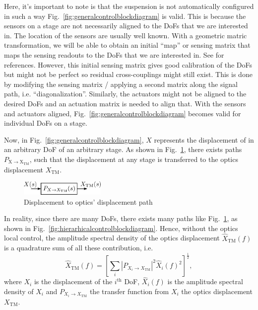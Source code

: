 Here, it's important to note is that the suspension is not automatically configured in such a way Fig.~\ref{fig:generalcontrolblockdiagram} is valid.
This is because the sensors on a stage are not necessarily aligned to the DoFs that we are interested in.
The location of the sensors are usually well known.
With a geometric matric transformation, we will be able to obtain an initial ``map'' or sensing matrix that maps the sensing readouts to the DoFs that we are interested in.
See \cite{bs_suspension_diagonalization, sr_suspension_diagonalization, all_of_the_vibration,  sensing_matrices_oplev} for references.
However, this initial sensing matrix gives good calibration of the DoFs but might not be perfect so residual cross-couplings might still exist.
This is done by modifying the sensing matrix / applying a second matrix along the signal path, i.e. ``diagonalization''.
Similarly, the actuators might not be aligned to the desired DoFs and an actuation matrix is needed to align that.
With the sensors and actuators aligned, Fig.~\ref{fig:generalcontrolblockdiagram} becomes valid for individual DoFs on a stage.

Now, in Fig.~\ref{fig:generalcontrolblockdiagram}, $X$ represents the displacement of in an arbitrary DoF of an arbitrary stage.
As shown in Fig.~\ref{fig:displacementtooptics}, there exists paths $P_\mathrm{X\to X_\mathrm{TM}}$, such that the displacement at any stage is transferred to the optics displacement $X_\mathrm{TM}$.
\begin{figure}[!h]
	\centering
	\includegraphics[width=41mm]{figures/displacement_to_optics}
	\caption{Displacement to optics' displacement path}
	\label{fig:displacementtooptics}
\end{figure}
In reality, since there are many DoFs, there exists many paths like Fig.~\ref{fig:displacementtooptics}, as shown in Fig.~\ref{fig:hierarhicalcontrolblockdiagram}.
Hence, without the optics local control, the amplitude spectral density of the optics displacement $\hat{X}_\mathrm{TM}(f)$ is a quadrature sum of all these contribution, i.e.
\begin{equation}
	\hat{X}_\mathrm{TM}(f)=\left[\sum_i\left\lvert P_{X_i\to X_\mathrm{TM}}\right\rvert^2 \hat{X}_i(f)^2\right]^{\frac{1}{2}},
	\label{eqn:x_tm_asd}
\end{equation}
where $X_i$ is the displacement of the $i^\mathrm{th}$ DoF, $\hat{X}_i(f)$ is the amplitude spectral density of $X_i$ and $P_{X_i\to X_\mathrm{TM}}$ the transfer function from $X_i$ the optics displacement $X_\mathrm{TM}$.

